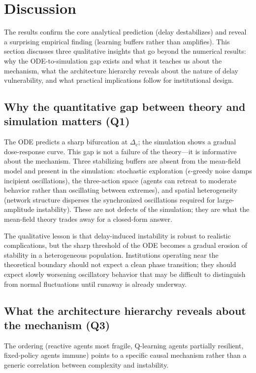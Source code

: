 \section{Discussion}

The results confirm the core analytical prediction (delay destabilizes) and reveal a surprising empirical finding (learning buffers rather than amplifies). This section discusses three qualitative insights that go beyond the numerical results: why the ODE-to-simulation gap exists and what it teaches us about the mechanism, what the architecture hierarchy reveals about the nature of delay vulnerability, and what practical implications follow for institutional design.

\subsection{Why the quantitative gap between theory and simulation matters (Q1)}

The ODE predicts a sharp bifurcation at $\Delta_c$; the simulation shows a gradual dose-response curve. This gap is not a failure of the theory---it is informative about the mechanism. Three stabilizing buffers are absent from the mean-field model and present in the simulation: stochastic exploration ($\epsilon$-greedy noise damps incipient oscillations), the three-action space (agents can retreat to moderate behavior rather than oscillating between extremes), and spatial heterogeneity (network structure disperses the synchronized oscillations required for large-amplitude instability). These are not defects of the simulation; they are what the mean-field theory trades away for a closed-form answer.

The qualitative lesson is that delay-induced instability is robust to realistic complications, but the sharp threshold of the ODE becomes a gradual erosion of stability in a heterogeneous population. Institutions operating near the theoretical boundary should not expect a clean phase transition; they should expect slowly worsening oscillatory behavior that may be difficult to distinguish from normal fluctuations until runaway is already underway.

\subsection{What the architecture hierarchy reveals about the mechanism (Q3)}

The ordering (reactive agents most fragile, Q-learning agents partially resilient, fixed-policy agents immune) points to a specific causal mechanism rather than a generic correlation between complexity and instability.

